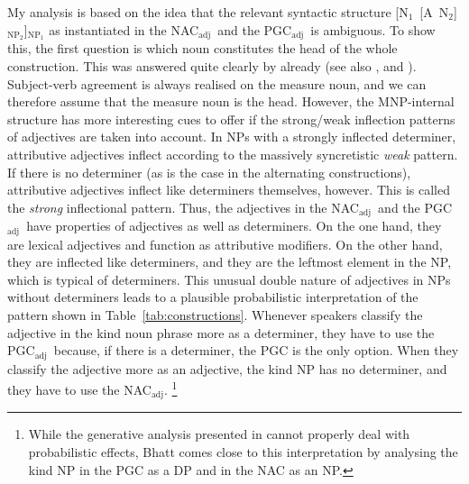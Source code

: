 \documentclass[USenglish]{article}
\newcommand{\Sub}[1]{\ensuremath{\mathrm{_{#1}}}}
\newcommand{\NACa}{NAC\Sub{adj}}
\newcommand{\PGCa}{PGC\Sub{adj}}
\begin{document}
My analysis is based on the idea that the relevant syntactic structure [N\Sub{1}~[A~N\Sub{2}]\Sub{NP\Sub{2}}]\Sub{NP\Sub{1}} as instantiated in the \NACa\ and the \PGCa\ is ambiguous.
To show this, the first question is which noun constitutes the head of the whole construction.
This was answered quite clearly by \cite{Loebel1986} already (see also \citealp[213]{Eschenbach1994}, and \citealp[16]{GallmannLindauer1994}).
Subject-verb agreement is always realised on the measure noun, and we can therefore assume that the measure noun is the head.
However, the MNP-internal structure has more interesting cues to offer if the strong\slash weak inflection patterns of adjectives are taken into account.
In NPs with a strongly inflected determiner, attributive adjectives inflect according to the massively syncretistic \textit{weak} pattern.
If there is no determiner (as is the case in the alternating constructions), attributive adjectives inflect like determiners themselves, however.
This is called the \textit{strong} inflectional pattern.
Thus, the adjectives in the \NACa\ and the \PGCa\ have properties of adjectives as well as determiners.
On the one hand, they are lexical adjectives and function as attributive modifiers.
On the other hand, they are inflected like determiners, and they are the leftmost element in the NP, which is typical of determiners.
This unusual double nature of adjectives in NPs without determiners leads to a plausible probabilistic interpretation of the pattern shown in Table~\ref{tab:constructions}.
Whenever speakers classify the adjective in the kind noun phrase more as a determiner, they have to use the \PGCa\ because, if there is a determiner, the PGC is the only option.
When they classify the adjective more as an adjective, the kind NP has no determiner, and they have to use the \NACa.%
\footnote{While the generative analysis presented in \cite{Bhatt1990} cannot properly deal with probabilistic effects, Bhatt comes close to this interpretation by analysing the kind NP in the PGC as a DP and in the NAC as an NP.}
\end{document}
